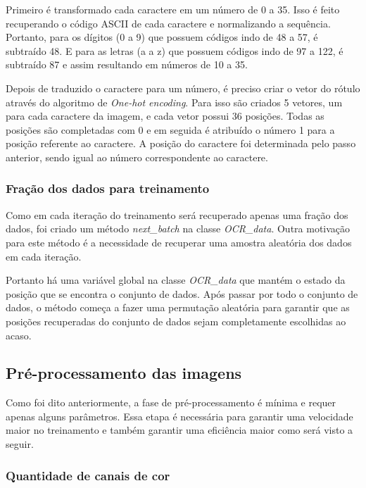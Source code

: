 Primeiro é transformado cada caractere em um número de 0 a 35. Isso é
feito recuperando o código ASCII de cada caractere e normalizando a
sequência. Portanto, para os dígitos (0 a 9) que possuem códigos indo
de 48 a 57, é subtraído 48. E para as letras (a a z) que possuem
códigos indo de 97 a 122, é subtraído 87 e assim resultando em números
de 10 a 35.

Depois de traduzido o caractere para um número, é preciso criar o
vetor do rótulo através do algoritmo de \textit{One-hot
  encoding}. Para isso são criados 5 vetores, um para cada caractere
da imagem, e cada vetor possui 36 posições. Todas as posições são
completadas com 0 e em seguida é atribuído o número 1 para a posição
referente ao caractere. A posição do caractere foi determinada pelo
passo anterior, sendo igual ao número correspondente ao caractere.

\subsubsection{Fração dos dados para treinamento}

Como em cada iteração do treinamento será recuperado apenas uma fração
dos dados, foi criado um método \textit{next\_batch} na classe
\textit{OCR\_data}. Outra motivação para este método é a necessidade de
recuperar uma amostra aleatória dos dados em cada iteração. 

Portanto há uma variável global na classe \textit{OCR\_data} que
mantém o estado da posição que se encontra o conjunto de dados. Após
passar por todo o conjunto de dados, o método começa a fazer uma
permutação aleatória para garantir que as posições recuperadas do
conjunto de dados sejam completamente escolhidas ao acaso.

\subsection{Pré-processamento das imagens}

Como foi dito anteriormente, a fase de pré-processamento é mínima e
requer apenas alguns parâmetros. Essa etapa é necessária para garantir
uma velocidade maior no treinamento e também garantir uma eficiência
maior como será visto a seguir.

\subsubsection{Quantidade de canais de cor}

